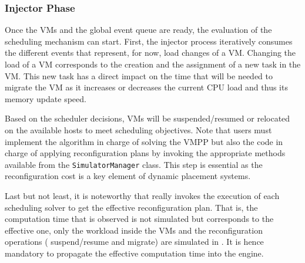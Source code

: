 \vspace*{-.4cm}
\subsubsection{Injector Phase}
Once the VMs and the global event queue are ready, the evaluation of
the scheduling mechanism can start. First, the injector process
iteratively consumes the different events that represent, for now, load changes of a VM.
Changing the load of
a VM corresponds to the creation and the assignment of a new \sg task
in the VM. This new task has a direct impact on the time that will be
needed to migrate the VM as it increases or decreases the current CPU
load and thus %
its memory update speed.
%

Based on the scheduler decisions, VMs will be suspended/resumed
or relocated on the available hosts to meet scheduling objectives. %
Note that users must implement the algorithm in
charge of solving the VMPP but also the code in charge of applying
reconfiguration plans by invoking the appropriate methods available
from the \texttt{SimulatorManager} class. This step is essential as
the reconfiguration cost is a key element of dynamic placement
systems.

Last but not least, it is noteworthy that \vmps really invokes the
execution of each scheduling solver to get the effective
reconfiguration plan.  That is, the computation time that is observed
is not simulated but corresponds to the effective one, only the
workload inside the VMs and the reconfiguration operations (\ie
suspend/resume and migrate)  are simulated in
\sg. It is hence mandatory to propagate the effective computation time into
the \sg engine.%

